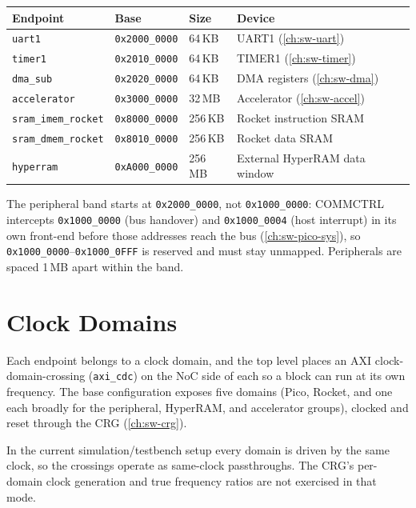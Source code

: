 \begin{longtable}{@{}llll@{}}
\toprule
\textbf{Endpoint} & \textbf{Base} & \textbf{Size} & \textbf{Device} \\
\midrule
\endhead
\texttt{uart1}            & \texttt{0x2000\_0000} & 64\,KB  & UART1 (\autoref{ch:sw-uart}) \\
\texttt{timer1}           & \texttt{0x2010\_0000} & 64\,KB  & TIMER1 (\autoref{ch:sw-timer}) \\
\texttt{dma\_sub}         & \texttt{0x2020\_0000} & 64\,KB  & DMA registers (\autoref{ch:sw-dma}) \\
\texttt{accelerator}      & \texttt{0x3000\_0000} & 32\,MB  & Accelerator (\autoref{ch:sw-accel}) \\
\texttt{sram\_imem\_rocket}& \texttt{0x8000\_0000} & 256\,KB & Rocket instruction SRAM \\
\texttt{sram\_dmem\_rocket}& \texttt{0x8010\_0000} & 256\,KB & Rocket data SRAM \\
\texttt{hyperram}         & \texttt{0xA000\_0000} & 256\,MB & External HyperRAM data window \\
\bottomrule
\end{longtable}

\begin{docwarning}
The peripheral band starts at \texttt{0x2000\_0000}, not \texttt{0x1000\_0000}: COMMCTRL intercepts
\texttt{0x1000\_0000} (bus handover) and \texttt{0x1000\_0004} (host interrupt) in its own front-end
before those addresses reach the bus (\autoref{ch:sw-pico-sys}), so \texttt{0x1000\_0000}--\texttt{0x1000\_0FFF}
is reserved and must stay unmapped. Peripherals are spaced 1\,MB apart within the band.
\end{docwarning}

\section{Clock Domains}
Each endpoint belongs to a clock domain, and the top level places an AXI clock-domain-crossing
(\texttt{axi\_cdc}) on the NoC side of each so a block can run at its own frequency. The base
configuration exposes five domains (Pico, Rocket, and one each broadly for the peripheral, HyperRAM, and
accelerator groups), clocked and reset through the CRG (\autoref{ch:sw-crg}).

\begin{docnote}
In the current simulation/testbench setup every domain is driven by the same clock, so the crossings
operate as same-clock passthroughs. The CRG's per-domain clock generation and true frequency ratios are
not exercised in that mode.
\end{docnote}

